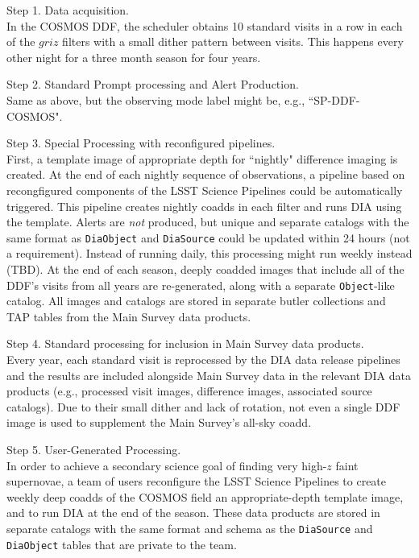 Step 1. Data acquisition. \\
In the COSMOS DDF, the scheduler obtains 10 standard visits in a row in each of the $griz$ filters
with a small dither pattern between visits.
This happens every other night for a three month season for four years.

Step 2. Standard Prompt processing and Alert Production. \\
Same as above, but the observing mode label might be, e.g., ``SP-DDF-COSMOS".

Step 3. Special Processing with reconfigured pipelines. \\
First, a template image of appropriate depth for ``nightly" difference imaging is created.
At the end of each nightly sequence of observations, a pipeline based on recongfigured 
components of the LSST Science Pipelines could be automatically triggered.
This pipeline creates nightly coadds in each filter and runs DIA using the template.
Alerts are \emph{not} produced, but unique and separate catalogs with the same format
as {\tt DiaObject} and {\tt DiaSource} could be updated within 24 hours (not a requirement).
Instead of running daily, this processing might run weekly instead (TBD).
At the end of each season, deeply coadded images that include all of the DDF's visits 
from all years are re-generated, along with a separate {\tt Object}-like catalog.
All images and catalogs are stored in separate butler collections and TAP tables from
the Main Survey data products.

Step 4. Standard processing for inclusion in Main Survey data products. \\
Every year, each standard visit is reprocessed by the DIA data release pipelines
and the results are included alongside Main Survey data in the relevant DIA data products
(e.g., processed visit images, difference images, associated source catalogs).
Due to their small dither and lack of rotation, not even a single DDF image 
is used to supplement the Main Survey's all-sky coadd.

Step 5. User-Generated Processing. \\
In order to achieve a secondary science goal of finding very high-$z$ faint supernovae,
a team of users reconfigure the LSST Science Pipelines to create weekly deep coadds
of the COSMOS field an appropriate-depth template image, and to run DIA at the
end of the season.
These data products are stored in separate catalogs with the same format and schema as
the {\tt DiaSource} and {\tt DiaObject} tables that are private to the team.


